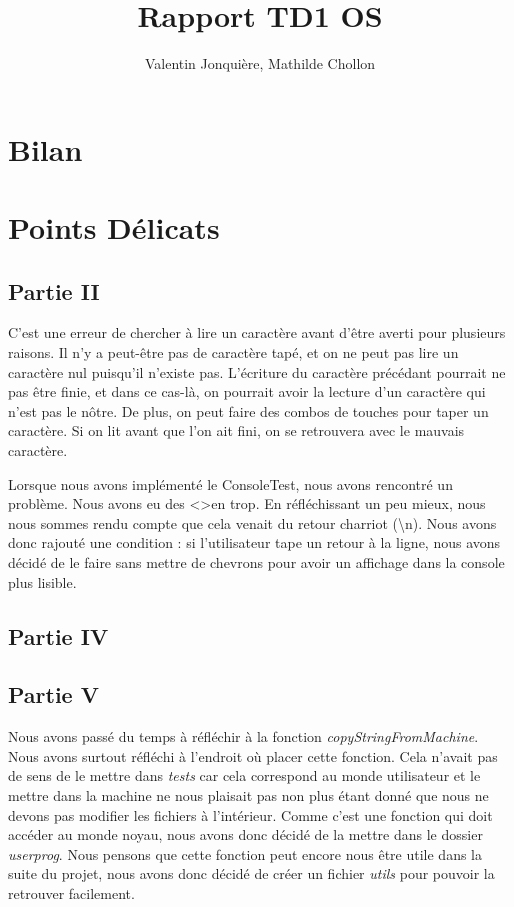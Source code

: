\documentclass{article}
\author{
    Valentin Jonquière,
    Mathilde Chollon
}
\title{Rapport TD1 OS}
\begin{document}
\maketitle

\pagebreak

\tableofcontents

\pagebreak

\section{Bilan}


\section{Points Délicats}
\subsection{Partie II}
C'est une erreur de chercher à lire un caractère avant d'être averti pour plusieurs raisons. Il n'y a peut-être pas de caractère tapé, et on ne peut pas lire un caractère nul puisqu'il n'existe pas.
L'écriture du caractère précédant pourrait ne pas être finie, et dans ce cas-là, on pourrait avoir la lecture d'un caractère qui n'est pas le nôtre.
De plus, on peut faire des combos de touches pour taper un caractère. Si on lit avant que l'on ait fini, on se retrouvera avec le mauvais caractère.

    Lorsque nous avons implémenté le ConsoleTest, nous avons rencontré un problème. Nous avons eu des \textless \textgreater en trop. En réfléchissant un peu mieux,
nous nous sommes rendu compte que cela venait du retour charriot (\textbackslash n). Nous avons donc rajouté une condition : si l'utilisateur tape un retour à la ligne, nous avons décidé de le faire sans mettre de chevrons pour avoir un affichage dans la console plus lisible.

\subsection{Partie IV}


\subsection{Partie V}
    Nous avons passé du temps à réfléchir à la fonction \textit{copyStringFromMachine}. Nous avons surtout réfléchi à l'endroit où placer cette fonction. Cela n'avait pas de sens de le mettre dans \textit{tests} 
car cela correspond au monde utilisateur et le mettre dans la machine ne nous plaisait pas non plus étant donné que nous ne devons pas modifier les 
fichiers à l'intérieur. Comme c'est une fonction qui doit accéder au monde noyau,
nous avons donc décidé de la mettre dans le dossier \textit{userprog}. Nous pensons que cette fonction peut encore nous être utile 
dans la suite du projet, nous avons donc décidé de créer un fichier \textit{utils} pour pouvoir la retrouver facilement.
\end{document}
